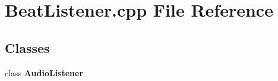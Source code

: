 \section{Beat\+Listener.\+cpp File Reference}
\label{_beat_listener_8cpp}
\subsection*{Classes}
\begin{DoxyCompactItemize}
\item 
class {\bf Audio\+Listener}
\end{DoxyCompactItemize}
